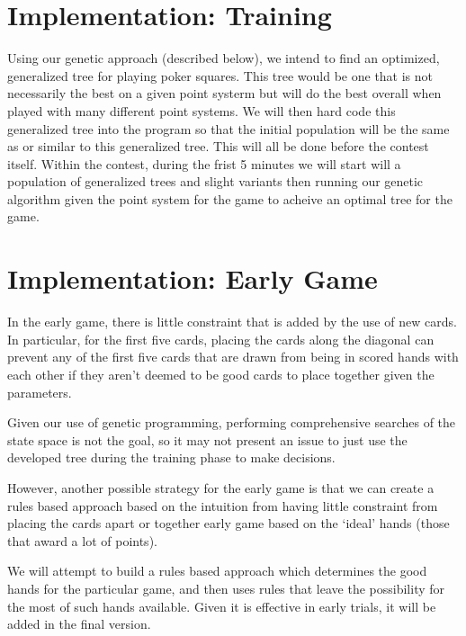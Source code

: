 \documentclass[twoside]{article}
\begin{document}
\begin{multicols}{2}

\section{Implementation: Training}
Using our genetic approach (described below), we intend to find an optimized, generalized tree for playing poker squares. This tree would be one that is not necessarily the best on a given point systerm but will do the best overall when played with many different point systems. We will then hard code this generalized tree into the program so that the initial population will be the same as or similar to this generalized tree. This will all be done before the contest itself. Within the contest, during the frist 5 minutes we will start will a population of generalized trees and slight variants then running our genetic algorithm given the point system for the game to acheive an optimal tree for the game. 



\section{Implementation: Early Game}
In the early game, there is little constraint that is added by the use of new cards. In particular, for the first five cards, placing the cards along the diagonal can prevent any of the first five cards that are drawn from being in scored hands with each other if they aren't deemed to be good cards to place together given the parameters.

Given our use of genetic programming, performing comprehensive searches of the state space is not the goal, so it may not present an issue to just use the developed tree during the training phase to make decisions.

However, another possible strategy for the early game is that we can create a rules based approach based on the intuition from having little constraint from placing the cards apart or together early game based on the `ideal' hands (those that award a lot of points).

We will attempt to build a rules based approach which determines the good hands for the particular game, and then uses rules that leave the possibility for the most of such hands available. Given it is effective in early trials, it will be added in the final version.


\end{multicols}
\end{document}
